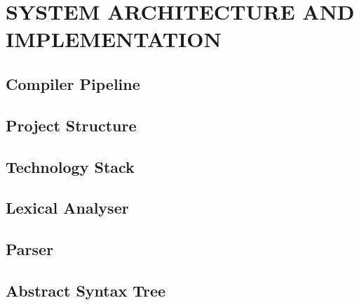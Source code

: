 \chapter{SYSTEM ARCHITECTURE AND IMPLEMENTATION}

\section{Compiler Pipeline}

\section{Project Structure}

\section{Technology Stack}

\section{Lexical Analyser}

\section{Parser}

\section{Abstract Syntax Tree}

